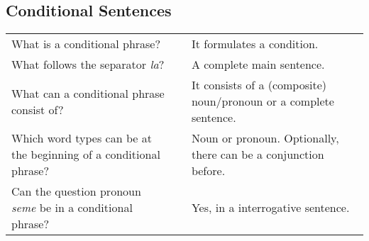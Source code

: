 \newpage
%
\subsection*{Conditional Sentences}
\label{'la'}
%


\begin{supertabular}{p{5,5cm}|ll}
    What is a conditional phrase?                                      &  & It formulates a condition.                                        \\  %
    What follows the separator \textit{la}?                            &  & A complete main sentence.                                         \\  %
    What can a conditional phrase consist of?                          &  & It consists of a (composite) noun/pronoun or a complete sentence. \\  %
    Which word types can be at the beginning of a conditional phrase?  &  & Noun or pronoun. Optionally, there can be a conjunction before.   \\  %
    Can the question pronoun \textit{seme} be in a conditional phrase? &  & Yes, in a interrogative sentence.                                 \\  %
\end{supertabular}

